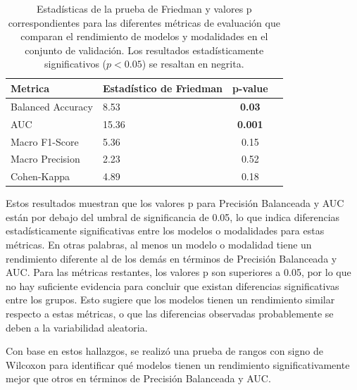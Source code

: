 \documentclass[a4paper,10pt]{book}
\begin{document}
\begin{table}[h!]
  \centering
\caption[Resumen de estadísticas y valores p de la prueba de Friedman para todas las métricas de evaluación.]{Estadísticas de la prueba de Friedman y valores p correspondientes para las diferentes métricas de evaluación que comparan el rendimiento de modelos y modalidades en el conjunto de validación. Los resultados estadísticamente significativos ($p < 0.05$) se resaltan en negrita.}
  \label{tab:friedman_test_results}
  \begin{tabular}{l l c c}
    \toprule
    \textbf{Metrica} & \textbf{Estadístico de Friedman} & \textbf{p-value} \\
    \midrule
    Balanced Accuracy & 8.53 & \textbf{0.03}  \\
    AUC  & 15.36  &  \textbf{0.001 }\\
    Macro F1-Score    &  5.36  & 0.15 \\
    Macro Precision & 2.23 &  0.52 \\
    Cohen-Kappa & 4.89 & 0.18 \\
    \bottomrule
  \end{tabular}
\end{table}

Estos resultados muestran que los valores p para Precisión Balanceada y AUC están por debajo del umbral de significancia de 0.05, lo que indica diferencias estadísticamente significativas entre los modelos o modalidades para estas métricas. En otras palabras, al menos un modelo o modalidad tiene un rendimiento diferente al de los demás en términos de Precisión Balanceada y AUC. Para las métricas restantes, los valores p son superiores a 0.05, por lo que no hay suficiente evidencia para concluir que existan diferencias significativas entre los grupos. Esto sugiere que los modelos tienen un rendimiento similar respecto a estas métricas, o que las diferencias observadas probablemente se deben a la variabilidad aleatoria.

Con base en estos hallazgos, se realizó una prueba de rangos con signo de Wilcoxon para identificar qué modelos tienen un rendimiento significativamente mejor que otros en términos de Precisión Balanceada y AUC.
\end{document}
